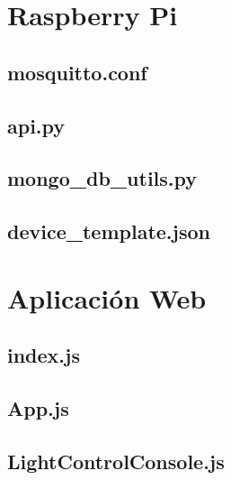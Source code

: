 


\section{Raspberry Pi} \label{anexo-rpi}

\subsection{mosquitto.conf} \label{anexo-mosquitto.conf}



\subsection{api.py} \label{api.py}



\subsection{mongo\_db\_utils.py} \label{anexo-falsk-mongo}



\subsection{device\_template.json} \label{anexo-device-template}





\section{Aplicación Web} \label{anexo-app-web}

\subsection{index.js} \label{anexo-index.js}



\subsection{App.js} \label{anexo-app.js}



\subsection{LightControlConsole.js} \label{anexo-lightcontrolconsole.js}






